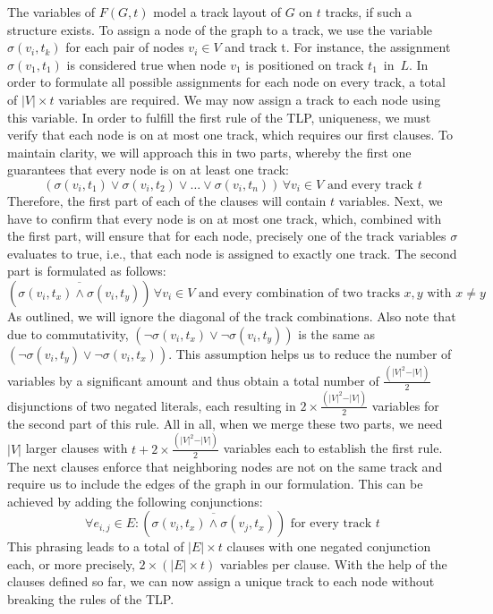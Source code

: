 \documentclass[bachelor, english]{algothesis}
\begin{document}
\noindent
The variables of $F(G, t)$ model a track layout of $G$ on $t$ tracks, if such a structure exists. To assign a node of the graph to a track, we use the variable $\sigma(v_i,t_k)$ for each pair of nodes $v_i \in V$ and track t. For instance, the assignment $\sigma(v_1, t_1)$ is considered true when node $v_1$ is positioned on track $t_1 \,$ in $\, L$. In order to formulate all possible assignments for each node on every track, a total of $ \vert V \vert \times t$ variables are required. We may now assign a track to each node using this variable. In order to fulfill the first rule of the TLP, uniqueness, we must verify that each node is on at most one track, which requires our first clauses. To maintain clarity, we will approach this in two parts, whereby the first one guarantees that every node is on at least one track:
    $$ (\sigma(v_i,t_1) \lor \sigma(v_i,t_2) \lor \dots \lor \sigma(v_i,t_n)) \, \forall v_i \in V \text{ and every track }t $$ 
Therefore, the first part of each of the clauses will contain $t$ variables. Next, we have to confirm that every node is on at most one track, which, combined with the first part, will ensure that for each node, precisely one of the track variables $\sigma$ evaluates to true, i.e., that each node is assigned to exactly one track. The second part is formulated as follows:
    $$ (\overline{\sigma(v_i, t_x) \land \sigma(v_i, t_y)}) \, \forall v_i \in V \text{ and every combination of two tracks } x, y \text{ with } x \neq y$$ 
\noindent
As outlined, we will ignore the diagonal of the track combinations. Also note that due to commutativity, $(\lnot \sigma(v_i, t_x) \lor \lnot \sigma(v_i, t_y))$ is the same as $(\lnot \sigma(v_i, t_y) \lor \lnot \sigma(v_i, t_x))$. This assumption helps us to reduce the number of variables by a significant amount and thus obtain a total number of $\frac{(\vert V \vert^2-\vert V \vert)}{2}$ disjunctions of two negated literals, each resulting in $2 \times \frac{(\vert V \vert^2-\vert V \vert)}{2}$ variables for the second part of this rule. All in all, when we merge these two parts, we need $\vert V \vert$ larger clauses with $t + 2 \times \frac{(\vert V \vert^2-\vert V \vert)}{2}$ variables each to establish the first rule. The next clauses enforce that neighboring nodes are not on the same track and require us to include the edges of the graph in our formulation. This can be achieved by adding the following conjunctions:
        $$ \forall e_{i,j} \in E : (\overline{\sigma(v_i,t_x) \land \sigma(v_j,t_x)}) \text{ for every track } t $$ 
This phrasing leads to a total of $\vert E \vert \times t$ clauses with one negated conjunction each, or more precisely, $2 \times (\vert E \vert \times t)$ variables per clause. With the help of the clauses defined so far, we can now assign a unique track to each node without breaking the rules of the TLP. 
\end{document}
